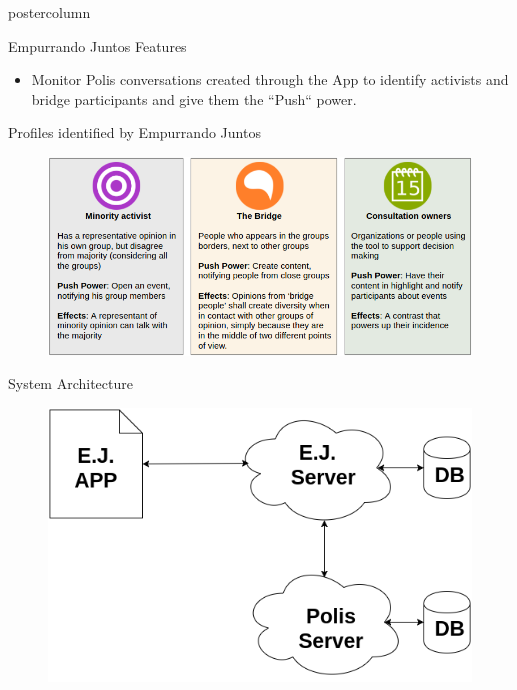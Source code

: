 \documentclass[final,hyperref={pdfpagelabels=false}]{beamer}
\begin{document}
\begin{frame}
\begin{columns}
\begin{column}{.49\textwidth}
\begin{beamercolorbox}[center,wd=\textwidth]{postercolumn}
\begin{minipage}[T]{.95\textwidth}
{\begin{block}{Empurrando Juntos Features}
\begin{itemize}
    \item Monitor Polis conversations created through the App
    to identify activists and bridge participants and give them the ``Push``
    power.
  \end{itemize}

\end{block}

\begin{block}{Profiles identified by Empurrando Juntos}
  \begin{figure}
    \begin{center}
      \includegraphics[scale=1.4]{../images/userprofiles.png}
      \caption{}
      \label{fig:user-profiles}
    \end{center}
  \end{figure}
\end{block}

\begin{block}{System Architecture}

  \begin{figure}
    \begin{center}
      \includegraphics[scale=1.3]{../images/polis4.png}
      \label{fig:architecture}
    \end{center}
  \end{figure}


\end{block}}
\end{minipage}
\end{beamercolorbox}
\end{column}
\end{columns}
\end{frame}
\end{document}
